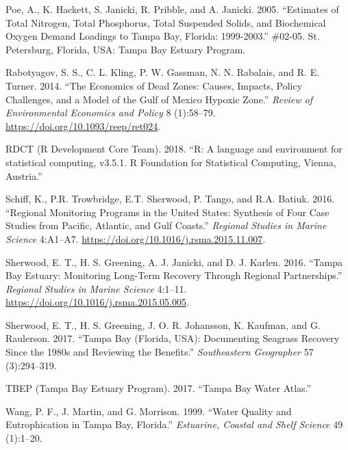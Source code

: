 \documentclass[]{article}
\begin{document}
\leavevmode\hypertarget{ref-Poe05}{}%
Poe, A., K. Hackett, S. Janicki, R. Pribble, and A. Janicki. 2005.
``Estimates of Total Nitrogen, Total Phosphorus, Total Suspended Solids,
and Biochemical Oxygen Demand Loadings to Tampa Bay, Florida:
1999-2003.'' \#02-05. St. Petersburg, Florida, USA: Tampa Bay Estuary
Program.

\leavevmode\hypertarget{ref-Rabotyagov14}{}%
Rabotyagov, S. S., C. L. Kling, P. W. Gassman, N. N. Rabalais, and R. E.
Turner. 2014. ``The Economics of Dead Zones: Causes, Impacts, Policy
Challenges, and a Model of the Gulf of Mexico Hypoxic Zone.''
\emph{Review of Environmental Economics and Policy} 8 (1):58--79.
\url{https://doi.org/10.1093/reep/ret024}.

\leavevmode\hypertarget{ref-RDCT18}{}%
RDCT (R Development Core Team). 2018. ``R: A language and environment
for statistical computing, v3.5.1. R Foundation for Statistical
Computing, Vienna, Austria.''

\leavevmode\hypertarget{ref-Schiff16}{}%
Schiff, K., P.R. Trowbridge, E.T. Sherwood, P. Tango, and R.A. Batiuk.
2016. ``Regional Monitoring Programs in the United States: Synthesis of
Four Case Studies from Pacific, Atlantic, and Gulf Coasts.''
\emph{Regional Studies in Marine Science} 4:A1--A7.
\url{https://doi.org/10.1016/j.rsma.2015.11.007}.

\leavevmode\hypertarget{ref-Sherwood16}{}%
Sherwood, E. T., H. S. Greening, A. J. Janicki, and D. J. Karlen. 2016.
``Tampa Bay Estuary: Monitoring Long-Term Recovery Through Regional
Partnerships.'' \emph{Regional Studies in Marine Science} 4:1--11.
\url{https://doi.org/10.1016/j.rsma.2015.05.005}.

\leavevmode\hypertarget{ref-Sherwood17}{}%
Sherwood, E. T., H. S. Greening, J. O. R. Johansson, K. Kaufman, and G.
Raulerson. 2017. ``Tampa Bay (Florida, USA): Documenting Seagrass
Recovery Since the 1980s and Reviewing the Benefits.''
\emph{Southeastern Geographer} 57 (3):294--319.

\leavevmode\hypertarget{ref-TBEP17}{}%
TBEP (Tampa Bay Estuary Program). 2017. ``Tampa Bay Water Atlas.''

\leavevmode\hypertarget{ref-Wang99}{}%
Wang, P. F., J. Martin, and G. Morrison. 1999. ``Water Quality and
Eutrophication in Tampa Bay, Florida.'' \emph{Estuarine, Coastal and
Shelf Science} 49 (1):1--20.
\end{document}
